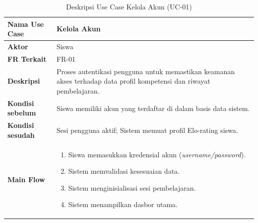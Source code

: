 \begin{table}[H]
    \centering
    \caption{Deskripsi Use Case Kelola Akun (UC-01)}
    \label{tbl:desc_uc01}
    \begin{tabular}{|p{}|p{}|}
        \hline
        \textbf{Nama Use Case} & \textbf{Kelola Akun} \\
        \hline
        \textbf{Aktor} & Siswa \\
        \hline
        \textbf{FR Terkait} & FR-01 \\
        \hline
        \textbf{Deskripsi} & Proses autentikasi pengguna untuk memastikan keamanan akses terhadap data profil kompetensi dan riwayat pembelajaran. \\
        \hline
        \textbf{Kondisi sebelum} & Siswa memiliki akun yang terdaftar di dalam basis data sistem. \\
        \hline
        \textbf{Kondisi sesudah} & Sesi pengguna aktif; Sistem memuat profil Elo-rating siswa. \\
        \hline
        \textbf{Main Flow} & \begin{enumerate}[noitemsep,topsep=0pt,leftmargin=*]
            \item Siswa memasukkan kredensial akun (\textit{username/password}).
            \item Sistem memvalidasi kesesuaian data.
            \item Sistem menginisialisasi sesi pembelajaran.
            \item Sistem menampilkan dasbor utama.
        \end{enumerate} \\
        \hline
    \end{tabular}
\end{table}